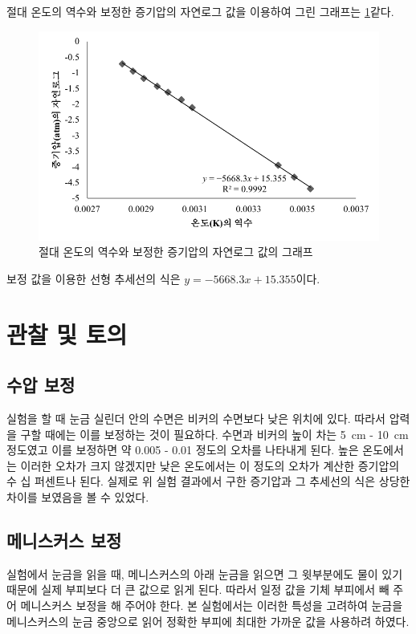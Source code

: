\documentclass{GSHS-chemexp}
\begin{document}
	절대 온도의 역수와 보정한 증기압의 자연로그 값을 이용하여 그린 그래프는 \ref{exp_graph_2}\과 같다.
	
	\begin{figure}[H]
		\centering
		\includegraphics[scale=1]{Book3_2.pdf}
		\caption{절대 온도의 역수와 보정한 증기압의 자연로그 값의 그래프}
		\label{exp_graph_2}
	\end{figure}
	
	보정 값을 이용한 선형 추세선의 식은 $y = -5668.3x + 15.355$이다.
	
	\section{관찰 및 토의}
	
	\subsection{수압 보정}
	실험을 할 때 눈금 실린더 안의 수면은 비커의 수면보다 낮은 위치에 있다. 따라서 압력을 구할 때에는 이를 보정하는 것이 필요하다. 수면과 비커의 높이 차는 \SI{5}{\centi\metre} - \SI{10}{\centi\metre} 정도였고 이를 보정하면 약 \SI{0.005}{\atmosphere} - \SI{0.01}{\atmosphere} 정도의 오차를 나타내게 된다. 높은 온도에서는 이러한 오차가 크지 않겠지만 낮은 온도에서는 이 정도의 오차가 계산한 증기압의 수 십 퍼센트나 된다. 실제로 위 실험 결과에서 구한 증기압과 그 추세선의 식은 상당한 차이를 보였음을 볼 수 있었다.
	
	\subsection{메니스커스 보정}
	실험에서 눈금을 읽을 때, 메니스커스의 아래 눈금을 읽으면 그 윗부분에도 물이 있기 때문에 실제 부피보다 더 큰 값으로 읽게 된다. 따라서 일정 값을 기체 부피에서 빼 주어 메니스커스 보정을 해 주어야 한다. 본 실험에서는 이러한 특성을 고려하여 눈금을 메니스커스의 눈금 중앙으로 읽어 정확한 부피에 최대한 가까운 값을 사용하려 하였다.
	
\end{document}
